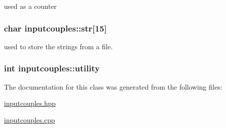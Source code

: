 used as a counter 

\hypertarget{classinputcouples_a7610a707dd089c210f966fe9b2945deb}{
\subsubsection[{str}]{\setlength{\rightskip}{0pt plus 5cm}char inputcouples\-::str\mbox{[}15\mbox{]}}}\label{classinputcouples_a7610a707dd089c210f966fe9b2945deb}


used to store the strings from a file. 

\hypertarget{classinputcouples_afe3651c7f5a5fca01b28e03fa0b46ae2}{
\subsubsection[{utility}]{\setlength{\rightskip}{0pt plus 5cm}int inputcouples\-::utility}}\label{classinputcouples_afe3651c7f5a5fca01b28e03fa0b46ae2}


The documentation for this class was generated from the following files\-:\begin{DoxyCompactItemize}
\item 
\hyperlink{inputcouples_8hpp}{inputcouples.\-hpp}\item 
\hyperlink{inputcouples_8cpp}{inputcouples.\-cpp}\end{DoxyCompactItemize}

